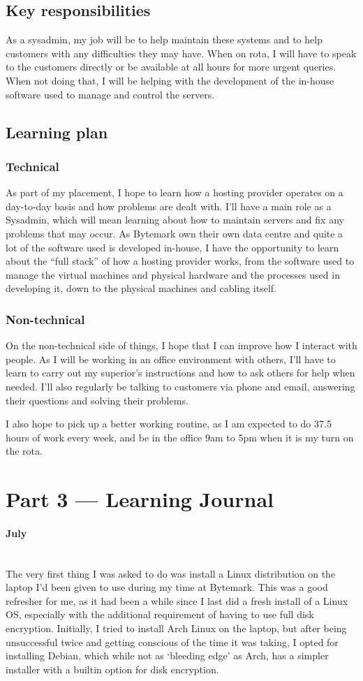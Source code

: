 \documentclass[12pt,a4paper]{article}
\newcommand{\paragraphnl}[1]{\paragraph{#1}\mbox{}\\}
\begin{document}
\subsection*{Key responsibilities}
	As a sysadmin, my job will be to help maintain these systems and to help
	customers with any difficulties they may have. When on rota, I will have to
	speak to the customers directly or be available at all hours for more
	urgent queries. When not doing that, I will be helping with the development
	of the in-house software used to manage and control the servers.

\subsection*{Learning plan}
\subsubsection*{Technical}
	As part of my placement, I hope to learn how a hosting provider operates on
	a day-to-day basis and how problems are dealt with. I'll have a main role
	as a Sysadmin, which will mean learning about how to maintain servers and
	fix any problems that may occur.
	As Bytemark own their own data centre and quite a lot of the software used
	is developed in-house, I have the opportunity to learn about the
	``full stack'' of how a hosting provider works, from the software used to
	manage the virtual machines and physical hardware and the processes used in
	developing it, down to the physical machines and cabling itself.

\subsubsection*{Non-technical}
	On the non-technical side of things, I hope that I can improve how I
	interact with people. As I will be working in an office environment with
	others, I'll have to learn to carry out my superior's instructions and how
	to ask others for help when needed. I'll also regularly be talking to
	customers via phone and email, answering their questions and solving their
	problems.

	I also hope to pick up a better working routine, as I am expected to do
	37.5 hours of work every week, and be in the office 9am to 5pm when it is
	my turn on the rota.

\section*{Part 3 --- Learning Journal}
\paragraphnl{July}
	The very first thing I was asked to do was install a Linux distribution on
	the laptop I'd been given to use during my time at Bytemark. This was a
	good refresher for me, as it had been a while since I last did a fresh
	install of a Linux OS, especially with the additional requirement of having
	to use full disk encryption. Initially, I tried to install Arch Linux on
	the laptop, but after being unsuccessful twice and getting conscious of the
	time it was taking, I opted for installing Debian, which while not as
	`bleeding edge' as Arch, has a simpler installer with a builtin option for
	disk encryption.
\end{document}
